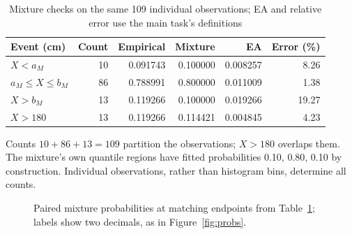 \documentclass[10pt,a4paper]{article}
\begin{document}
\begin{table}[htbp]
\centering\footnotesize
\caption{Mixture checks on the same 109 individual observations;
EA and relative error use the main task's definitions}\label{tab:mixprob}
\setlength{\tabcolsep}{4pt}
\begin{tabularx}{\linewidth}{@{}>{\raggedright\arraybackslash}Xrrrrr@{}}\toprule
Event (cm) & Count & Empirical & Mixture & EA & Error (\%)\\\midrule
$X<a_M$ & 10 & 0.091743 & 0.100000 & 0.008257 & 8.26\\
$a_M\le X\le b_M$ & 86 & 0.788991 & 0.800000 & 0.011009 & 1.38\\
$X>b_M$ & 13 & 0.119266 & 0.100000 & 0.019266 & 19.27\\
$X>180$ & 13 & 0.119266 & 0.114421 & 0.004845 & 4.23\\
\bottomrule\end{tabularx}
\end{table}
Counts $10+86+13=109$ partition the observations; $X>180$ overlaps them.
The mixture's own quantile regions have fitted probabilities 0.10, 0.80,
0.10 by construction. Individual observations, rather than histogram bins,
determine all counts.

\begin{figure}[htbp]
\centering
{}
\caption{Paired mixture probabilities at matching endpoints from
Table~\ref{tab:mixprob}; labels show two decimals, as in Figure~\ref{fig:probs}.}
\label{fig:mixprobs}
\end{figure}
\end{document}
